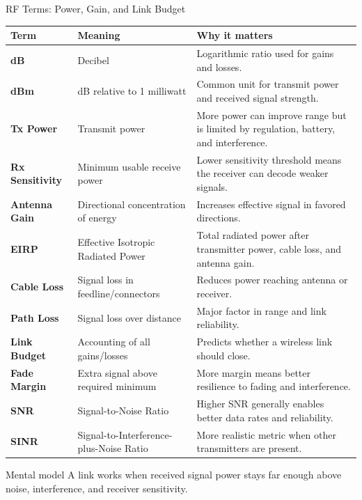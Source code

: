 \documentclass[aspectratio=169]{beamer}
\begin{document}
\begin{frame}{RF Terms: Power, Gain, and Link Budget}
\tiny
\begin{tabular}{p{2.0cm} p{3.4cm} p{6.7cm}}
\toprule
\textbf{Term} & \textbf{Meaning} & \textbf{Why it matters} \\
\midrule
\textbf{dB} & Decibel & Logarithmic ratio used for gains and losses. \\
\textbf{dBm} & dB relative to 1 milliwatt & Common unit for transmit power and received signal strength. \\
\textbf{Tx Power} & Transmit power & More power can improve range but is limited by regulation, battery, and interference. \\
\textbf{Rx Sensitivity} & Minimum usable receive power & Lower sensitivity threshold means the receiver can decode weaker signals. \\
\textbf{Antenna Gain} & Directional concentration of energy & Increases effective signal in favored directions. \\
\textbf{EIRP} & Effective Isotropic Radiated Power & Total radiated power after transmitter power, cable loss, and antenna gain. \\
\textbf{Cable Loss} & Signal loss in feedline/connectors & Reduces power reaching antenna or receiver. \\
\textbf{Path Loss} & Signal loss over distance & Major factor in range and link reliability. \\
\textbf{Link Budget} & Accounting of all gains/losses & Predicts whether a wireless link should close. \\
\textbf{Fade Margin} & Extra signal above required minimum & More margin means better resilience to fading and interference. \\
\textbf{SNR} & Signal-to-Noise Ratio & Higher SNR generally enables better data rates and reliability. \\
\textbf{SINR} & Signal-to-Interference-plus-Noise Ratio & More realistic metric when other transmitters are present. \\
\bottomrule
\end{tabular}

\vspace{0.15cm}
\begin{block}{Mental model}
A link works when received signal power stays far enough above noise, interference, and receiver sensitivity.
\end{block}
\end{frame}
\end{document}
